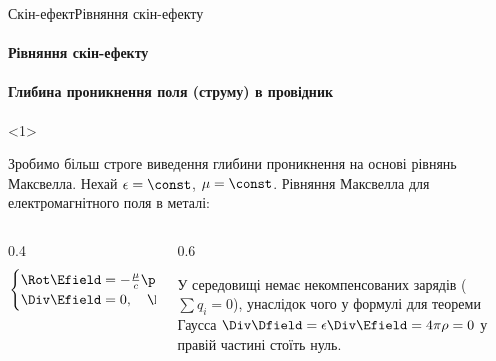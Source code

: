 \documentclass[onlytextwidth]{beamer}
\begin{document}
\begin{frame}{Скін-ефект}{Рівняння скін-ефекту}
	\framesubtitle<1>{Рівняння скін-ефекту}
	\framesubtitle<2>{Глибина проникнення поля (струму) в провідник}
	\begin{onlyenv}\small
		\begin{block}{}\justifying
			Зробимо більш строге виведення глибини проникнення на основі рівнянь Максвелла.
			Нехай $\epsilon = \const$, $\mu = \const$.
			Рівняння Максвелла для
			електромагнітного поля в металі:
			\begin{columns}
				\begin{column}{0.4\linewidth}
					\begin{equation*}
						\begin{cases}
							\Rot\Efield = - \frac{\mu}{c}\parttime{\Hfield},\quad \Rot\Hfield = \frac{4\pi}{c}\vect{j}, \\
							\Div\Efield= 0, \quad \Div\Hfield = 0.
						\end{cases}
					\end{equation*}
				\end{column}
				\begin{column}{0.6\linewidth}
					\begin{block}{}\justifying\footnotesize
						У середовищі немає некомпенсованих зарядів ($\sum q_i = 0$), унаслідок чого у формулі для теореми Гаусса
						$\Div\Dfield = \epsilon\Div\Efield =  4\pi\rho = 0$ у правій частині стоїть нуль.
					\end{block}
				\end{column}
			\end{columns}
		\end{block}


\end{onlyenv}
\end{frame}
\end{document}
